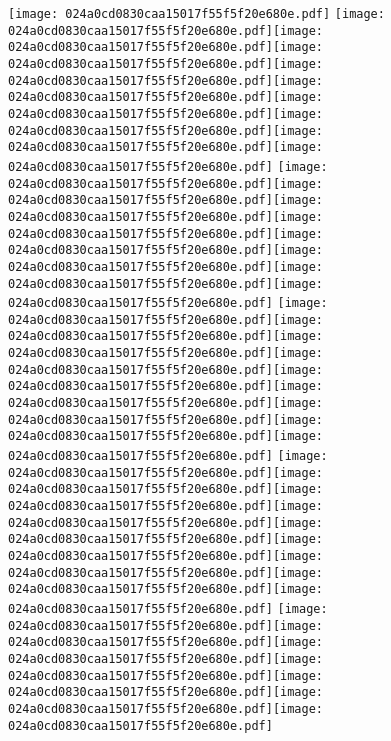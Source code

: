\documentclass{article}
\newcommand{\origpg}[2]{\texttt{[image: 024a0cd0830caa15017f55f5f20e680e.pdf]}}
\begin{document}
{\vspace{27.964pt}\hspace{35.438pt}\origpg{11}{120.74pt 625.79pt 131.51pt 641.93pt} \origpg{11}{147.45pt 625.79pt 154.62pt 641.93pt}\origpg{11}{154.67pt 625.79pt 162.72pt 641.93pt}\origpg{11}{162.63pt 625.79pt 169.79pt 641.93pt}\hspace{-0.42pt}\origpg{11}{169.37pt 625.79pt 177.59pt 641.93pt}\origpg{11}{177.59pt 625.79pt 185.66pt 641.93pt}\hspace{-0.387pt}\origpg{11}{185.27pt 625.79pt 197.33pt 641.93pt}\origpg{11}{197.33pt 625.79pt 209.75pt 641.93pt}\origpg{11}{209.82pt 625.79pt 216.99pt 641.93pt}\hspace{-0.178pt}\origpg{11}{3in 625.79pt 227.02pt 641.93pt} \origpg{11}{242.81pt 625.79pt 251.45pt 641.93pt}\origpg{11}{251.45pt 625.79pt 258.61pt 641.93pt}\hspace{-0.145pt}\origpg{11}{258.47pt 625.79pt 266.54pt 641.93pt}\hspace{-0.839pt}\origpg{11}{265.7pt 625.79pt 273.77pt 641.93pt}\hspace{-0.597pt}\origpg{11}{273.17pt 625.79pt 281.39pt 641.93pt}\origpg{11}{281.39pt 625.79pt 290.02pt 641.93pt}\origpg{11}{290.02pt 625.79pt 298.09pt 641.93pt}\hspace{-0.355pt}\origpg{11}{297.74pt 625.79pt 307.95pt 641.93pt} \origpg{11}{323.74pt 625.79pt 330.9pt 641.93pt}\origpg{11}{330.95pt 625.79pt 339.02pt 641.93pt}\hspace{0.339pt}\origpg{11}{339.36pt 625.79pt 346.53pt 641.93pt}\origpg{11}{346.58pt 625.79pt 353.63pt 641.93pt}\hspace{-0.307pt}\origpg{11}{353.32pt 625.79pt 361.39pt 641.93pt}\hspace{-0.355pt}\origpg{11}{361.04pt 625.79pt 129.5mm 641.93pt}\origpg{11}{129.5mm 625.79pt 377.1pt 641.93pt}\origpg{11}{377.16pt 625.79pt 385.8pt 641.93pt}\origpg{11}{385.8pt 625.79pt 394.43pt 641.93pt} \origpg{11}{410.15pt 625.79pt 417.32pt 641.93pt}\origpg{11}{417.37pt 625.79pt 426pt 641.93pt}\origpg{11}{426pt 625.79pt 436.22pt 641.93pt}\origpg{11}{436.15pt 625.79pt 444.23pt 641.93pt}\hspace{-1.081pt}\origpg{11}{443.14pt 625.79pt 451.2pt 641.93pt}\origpg{11}{451.1pt 625.79pt 458.53pt 641.93pt}\origpg{11}{458.53pt 625.79pt 467.16pt 641.93pt}\origpg{11}{467.22pt 625.79pt 475.86pt 641.93pt}\origpg{11}{475.86pt 625.79pt 484.5pt 641.93pt} \origpg{11}{500.44pt 625.79pt 507.61pt 641.93pt}\hspace{-0.178pt}\origpg{11}{507.43pt 625.79pt 516.07pt 641.93pt}\origpg{11}{516.07pt 625.79pt 523.23pt 641.93pt}\origpg{11}{523.31pt 625.79pt 530.37pt 641.93pt}\origpg{11}{530.3pt 625.79pt 537.47pt 641.93pt}\hspace{-0.178pt}\origpg{11}{537.29pt 625.79pt 547.51pt 641.93pt}\origpg{11}{547.41pt 625.79pt 554.58pt 641.93pt} 

}
\end{document}
